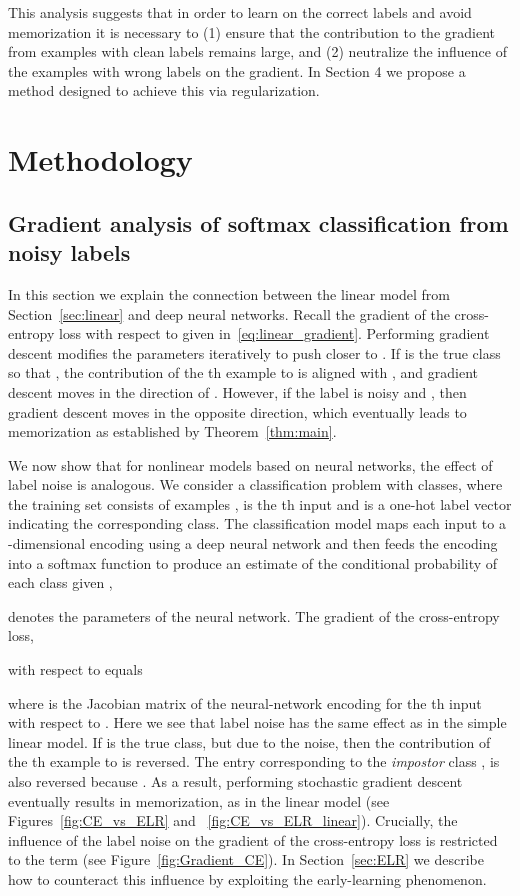 \documentclass{article}
\newcommand{\1}{\mathds{1}}
\begin{document}
This analysis suggests that in order to learn on the correct labels and avoid memorization it is necessary to (1) ensure that the contribution to the gradient from examples with clean labels remains large, and (2) neutralize the influence of the examples with wrong labels on the gradient. In Section 4 we propose a method designed to achieve this via regularization.



\section{Methodology}\label{sec:methodology}

\subsection{Gradient analysis of softmax classification from noisy labels}
\label{sec:motivation}
In this section we explain the connection between the linear model from Section~\ref{sec:linear} and deep neural networks. Recall the gradient of the cross-entropy loss with respect to  given in~\eqref{eq:linear_gradient}.
Performing gradient descent modifies the parameters iteratively to push  closer to . If  is the true class so that , the contribution of the th example to  is aligned with , and gradient descent moves in the direction of . However, if the label is noisy and , then gradient descent moves in the opposite direction, which eventually leads to memorization as established by Theorem~\ref{thm:main}. 

We now show that for nonlinear models based on neural networks, the effect of label noise is analogous. We consider a classification problem with  classes, where the training set consists of  examples ,  is the th input and  is a one-hot label vector indicating the corresponding class. The classification model maps each input  to a -dimensional encoding using a deep neural network  and then feeds the encoding into a softmax function  to produce an estimate  of the conditional probability of each class given , 

 denotes the parameters of the neural network. The gradient of the cross-entropy loss,

with respect to  equals

where  is the Jacobian matrix of the neural-network encoding for the th input with respect to . Here we see that label noise has the same effect as in the simple linear model. If  is the true class, but  due to the noise, then the contribution of the th example to  is reversed. The entry corresponding to the \emph{impostor} class , is also reversed because . As a result, performing stochastic gradient descent eventually results in memorization, as in the linear model (see Figures~\ref{fig:CE_vs_ELR} and~
\ref{fig:CE_vs_ELR_linear}). Crucially, the influence of the label noise on the gradient of the cross-entropy loss is restricted to the term  (see Figure~\ref{fig:Gradient_CE}). In Section~\ref{sec:ELR} we describe how to counteract this influence by exploiting the early-learning phenomenon. 
\end{document}
